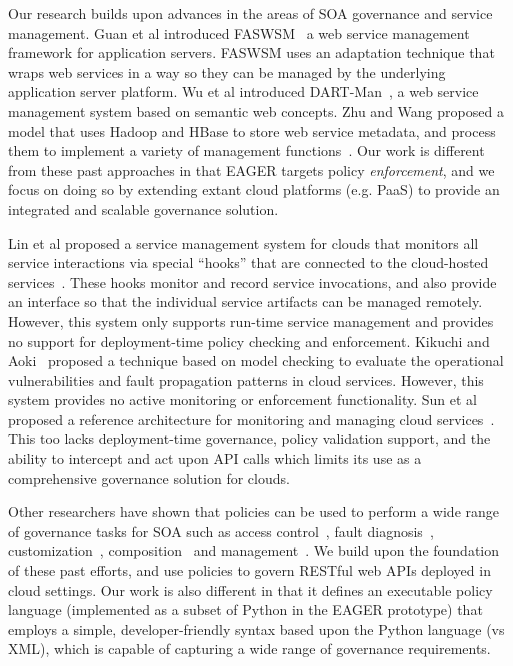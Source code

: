 Our research builds upon advances in the areas of SOA governance and
service management. 
Guan et al introduced FASWSM~\cite{1607141} a web service management
framework for application servers. FASWSM uses an adaptation technique that
wraps web services in a way so they can be managed by the underlying
application server platform. Wu et al introduced DART-Man~\cite{1504267}, a web
service management system based on semantic web concepts.  Zhu and Wang
proposed a model that uses Hadoop and HBase to store web service metadata, and
process them to implement a variety of management functions~\cite{5959326}.
Our work is different 
from these past approaches in that EAGER targets policy \textit{enforcement}, 
and we focus on doing so by extending extant
cloud platforms (e.g. PaaS) to provide an integrated and scalable governance
solution.

Lin et al proposed a service management system for clouds that monitors all
service interactions via special ``hooks'' that are connected to the
cloud-hosted services~\cite{5616981}. These hooks monitor and record service
invocations, and also provide an interface so that the individual service
artifacts can be managed remotely. However, this system only supports run-time
service management and provides no support for deployment-time policy checking
and enforcement.  Kikuchi and Aoki~\cite{6525502} proposed a technique
based on model checking to evaluate the operational vulnerabilities and fault
propagation patterns in cloud services. However, this system provides no
active monitoring or enforcement functionality.
Sun et al proposed a reference architecture for monitoring and managing cloud
services~\cite{5579654}. This too lacks deployment-time governance, policy
validation support, and the ability to intercept and act upon API calls which
limits its use as a comprehensive governance solution for clouds.

Other researchers have shown that policies can be
used to perform a wide range of governance tasks for SOA such as access
control~\cite{4279630,5713420}, fault diagnosis~\cite{6154236},
customization~\cite{4027138},
composition~\cite{1592403,Erradi:2006:PMS:1515984.1515990} and
management~\cite{Suleiman:2009:IUM:1564601.1564730,6481237,4028029}. We build
upon the foundation of these past efforts, and use policies to govern
RESTful web APIs deployed in cloud settings. 
Our work is also different in that it defines an executable
policy language (implemented as a subset of Python in the EAGER prototype)
 that employs a simple, developer-friendly syntax
based upon the Python language (vs XML), 
which is capable of capturing
a wide range of governance requirements.

